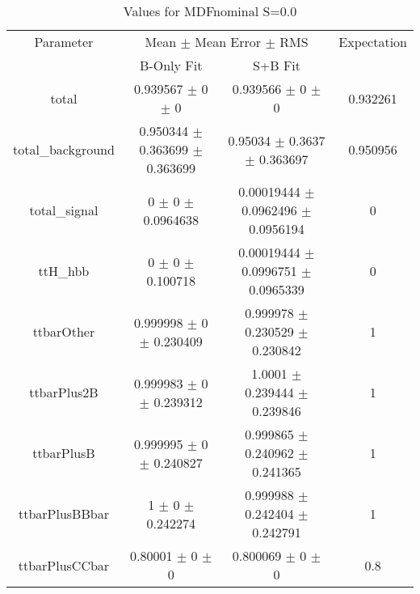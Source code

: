 \begin{table}
\centering
\caption{Values for MDFnominal S=0.0}
\begin{tabular}{cccc}
\toprule
Parameter & \multicolumn{2}{c}{Mean $\pm$ Mean Error $\pm$ RMS} & Expectation\\
 & B-Only Fit & S+B Fit & \\
\midrule
total & \num{0.939567} $\pm$ \num{0} $\pm$ \num{0} & \num{0.939566} $\pm$ \num{0} $\pm$ \num{0} & \num{0.932261}\\
total\_background & \num{0.950344} $\pm$ \num{0.363699} $\pm$ \num{0.363699} & \num{0.95034} $\pm$ \num{0.3637} $\pm$ \num{0.363697} & \num{0.950956}\\
total\_signal & \num{0} $\pm$ \num{0} $\pm$ \num{0.0964638} & \num{0.00019444} $\pm$ \num{0.0962496} $\pm$ \num{0.0956194} & \num{0}\\
ttH\_hbb & \num{0} $\pm$ \num{0} $\pm$ \num{0.100718} & \num{0.00019444} $\pm$ \num{0.0996751} $\pm$ \num{0.0965339} & \num{0}\\
ttbarOther & \num{0.999998} $\pm$ \num{0} $\pm$ \num{0.230409} & \num{0.999978} $\pm$ \num{0.230529} $\pm$ \num{0.230842} & \num{1}\\
ttbarPlus2B & \num{0.999983} $\pm$ \num{0} $\pm$ \num{0.239312} & \num{1.0001} $\pm$ \num{0.239444} $\pm$ \num{0.239846} & \num{1}\\
ttbarPlusB & \num{0.999995} $\pm$ \num{0} $\pm$ \num{0.240827} & \num{0.999865} $\pm$ \num{0.240962} $\pm$ \num{0.241365} & \num{1}\\
ttbarPlusBBbar & \num{1} $\pm$ \num{0} $\pm$ \num{0.242274} & \num{0.999988} $\pm$ \num{0.242404} $\pm$ \num{0.242791} & \num{1}\\
ttbarPlusCCbar & \num{0.80001} $\pm$ \num{0} $\pm$ \num{0} & \num{0.800069} $\pm$ \num{0} $\pm$ \num{0} & \num{0.8}\\
\bottomrule
\end{tabular}
\end{table}